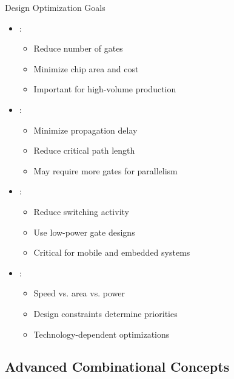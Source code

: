 \begin{frame}{Design Optimization Goals}
\begin{itemize}
\item {}:
\begin{itemize}
\item Reduce number of gates
\item Minimize chip area and cost
\item Important for high-volume production
\end{itemize}
\vspace{0.3cm}
\item {}:
\begin{itemize}
\item Minimize propagation delay
\item Reduce critical path length
\item May require more gates for parallelism
\end{itemize}
\vspace{0.3cm}
\item {}:
\begin{itemize}
\item Reduce switching activity
\item Use low-power gate designs
\item Critical for mobile and embedded systems
\end{itemize}
\vspace{0.3cm}
\item {}:
\begin{itemize}
\item Speed vs. area vs. power
\item Design constraints determine priorities
\item Technology-dependent optimizations
\end{itemize}
\end{itemize}
\end{frame}

\subsection{Advanced Combinational Concepts}


